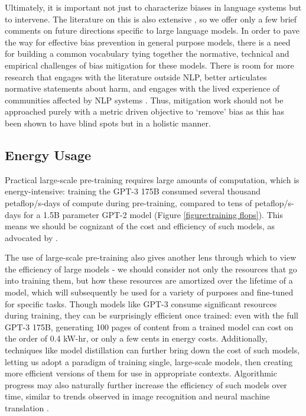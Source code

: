 Ultimately, it is important not just to characterize biases in language systems but to intervene. The literature on this is also extensive \cite{qian2019reducing,huang2019reducing}, so we offer only a few brief comments on future directions specific to large language models. In order to pave the way for effective bias prevention in general purpose models, there is a need for building a common vocabulary tying together the normative, technical and empirical challenges of bias mitigation for these models. There is room for more research that engages with the literature outside NLP, better articulates normative statements about harm, and engages with the lived experience of communities affected by NLP systems  \cite{blodgett2020language}. Thus, mitigation work should not be approached purely with a metric driven objective to `remove' bias as this has been shown to have blind spots \cite{gonen2019lipstick, nissim2019fair} but in a holistic manner.

    \subsection{Energy Usage}
    \label{section:Energy Usage}

Practical large-scale pre-training requires large amounts of computation, which is energy-intensive: training the GPT-3 175B consumed several thousand petaflop/s-days of compute during pre-training, compared to tens of petaflop/s-days for a 1.5B parameter GPT-2 model (Figure \ref{figure:training flops}). This means we should be cognizant of the cost and efficiency of such models, as advocated by \cite{schwartz2019}. 

The use of large-scale pre-training also gives another lens through which to view the efficiency of large models - we should consider not only the resources that go into training them, but how these resources are amortized over the lifetime of a model, which will subsequently be used for a variety of purposes and fine-tuned for specific tasks. Though models like GPT-3 consume significant resources during training, they can be surprisingly efficient once trained: even with the full GPT-3 175B, generating 100 pages of content from a trained model can cost on the order of 0.4 kW-hr, or only a few cents in energy costs. Additionally, techniques like model distillation \cite{liu2019improving} can further bring down the cost of such models, letting us adopt a paradigm of training single, large-scale models, then creating more efficient versions of them for use in appropriate contexts. Algorithmic progress may also naturally further increase the efficiency of such models over time, similar to trends observed in image recognition and neural machine translation \cite{hernandez2020}.


